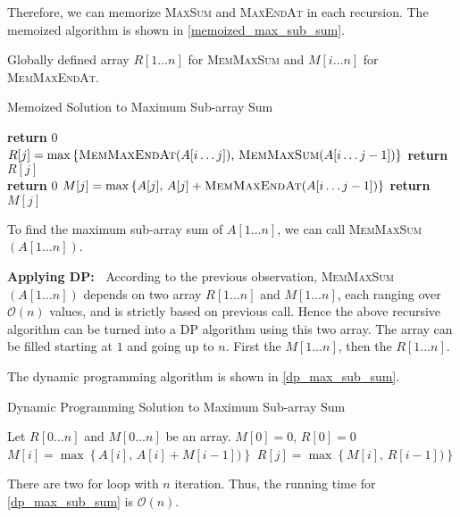 \begin{homeworkProblem}
Therefore, we can memorize \textsc{MaxSum} and \textsc{MaxEndAt} in each recursion.
The memoized algorithm is shown in \cref{memoized_max_sub_sum}.

Globally defined array $R[1 \ldots n]$ for \textsc{MemMaxSum} and $M[i \ldots n]$ for \textsc{MemMaxEndAt}.

\begin{algorithm}[H]
    \caption{Memoized Solution to Maximum Sub-array Sum}\label{memoized_max_sub_sum}
    \begin{algorithmic}[1]
                \State \textbf{return } $0$
            \EndIf
            \State $R[j] = \max\left\{\text{\textsc{MemMaxEndAt}}(A[i\ldots j])\text{,\ }\text{\textsc{MemMaxSum}}(A[i\ldots j-1])\right\}$
            \EndIf
            \State \textbf{return } $R[j]$
        \EndProcedure
        \\\hrulefill
                \State \textbf{return } $0$
            \EndIf
            \State $M[j] = \max\left\{A[j]\text{,\ }A[j] + \text{\textsc{MemMaxEndAt}}(A[i\ldots j-1])\right\}$
            \EndIf
            \State \textbf{return } $M[j]$
        \EndProcedure
    \end{algorithmic}
\end{algorithm}

To find the maximum sub-array sum of $A[1\ldots n]$, we can call \textsc{MemMaxSum}$(A[1\ldots n])$.

\vspace{0.1in}
\textbf{Applying DP:\ }
According to the previous observation, \textsc{MemMaxSum}$(A[1\ldots n])$ depends on two array 
$R[1\ldots n]$ and $M[1\ldots n]$, each ranging over $\mathcal{O}(n)$ values, and is strictly
based on previous call. Hence the above recursive algorithm can be turned into a DP
algorithm using this two array. The array can be filled starting at $1$ and going up to $n$.
First the $M[1\ldots n]$, then the $R[1\dots n]$.

The dynamic programming algorithm is shown in \cref{dp_max_sub_sum}.

\begin{algorithm}[H]
    \caption{Dynamic Programming Solution to Maximum Sub-array Sum}\label{dp_max_sub_sum}
    \begin{algorithmic}[1]
            \State Let $R[0\ldots n]$ and $M[0\ldots n]$ be an array.
            \State $M[0] = 0$, $R[0] = 0$
                \State $M[i] = \max\left\{A[i]\text{,\ }A[i] + M[i-1])\right\}$
            \EndFor
                \State $R[j] = \max\left\{M[i]\text{,\ }R[i-1])\right\}$
            \EndFor
        \EndProcedure
    \end{algorithmic}
\end{algorithm}

There are two for loop with $n$ iteration. Thus, the running time for \cref{dp_max_sub_sum} is $\mathcal{O}(n)$.

\end{homeworkProblem}
